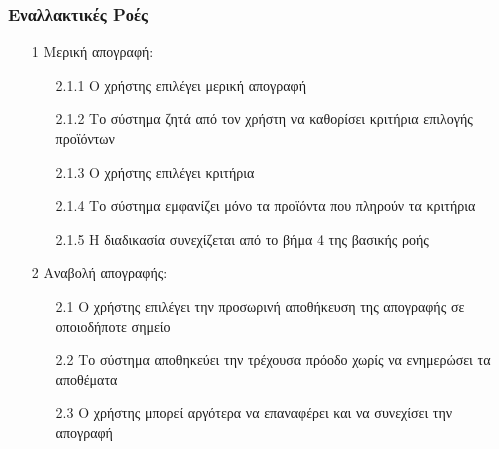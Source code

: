 \documentclass[12pt,a4paper,twoside]{book}
\begin{document}
\subsubsection{Εναλλακτικές Ροές}
\begin{enumerate}
  \item[1 ] Μερική απογραφή:
        \begin{enumerate}
          \item[2.1.1 ] Ο χρήστης επιλέγει μερική απογραφή
          \item[2.1.2 ] Το σύστημα ζητά από τον χρήστη να καθορίσει κριτήρια επιλογής προϊόντων
          \item[2.1.3 ] Ο χρήστης επιλέγει κριτήρια %
          \item[2.1.4 ] Το σύστημα εμφανίζει μόνο τα προϊόντα που πληρούν τα κριτήρια
          \item[2.1.5 ] Η διαδικασία συνεχίζεται από το βήμα 4 της βασικής ροής %
        \end{enumerate}
  \item[2 ] Αναβολή απογραφής:
        \begin{enumerate}
          \item [2.1 ] Ο χρήστης επιλέγει την προσωρινή αποθήκευση της απογραφής σε οποιοδήποτε σημείο %
          \item [2.2 ] Το σύστημα αποθηκεύει την τρέχουσα πρόοδο χωρίς να ενημερώσει τα αποθέματα %
          \item [2.3 ] Ο χρήστης μπορεί αργότερα να επαναφέρει και να συνεχίσει την απογραφή
        \end{enumerate}

\end{enumerate}
\end{document}
